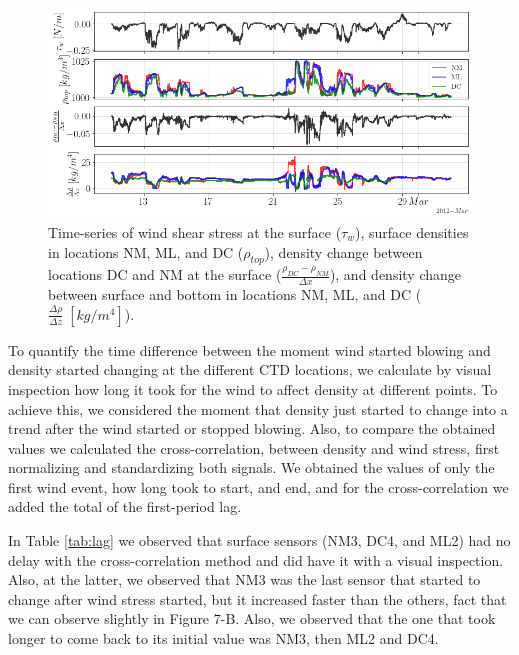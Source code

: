 \documentclass[tesis.tex]{subfiles}
\begin{document}
\begin{figure}[h!]
    \centering
    \includegraphics[width=\textwidth]{Imagenes/diff.png}
    \caption{Time-series of wind shear stress at the surface ($\tau_w$), surface densities in locations NM, ML, and DC ($\rho_{top}$), density change between locations DC and NM at the surface ($\frac{\rho_{DC}-\rho_{NM}}{\Delta x}$), and density change between surface and bottom in locations NM, ML, and DC ($\frac{\Delta \rho}{\Delta z} \; [kg/m^4]$).}
    \label{fig:diff}
\end{figure}

To quantify the time difference between the moment wind started blowing and density started changing at the different CTD locations, we calculate by visual inspection how long it took for the wind to affect density at different points. To achieve this, we considered the moment that density just started to change into a trend after the wind started or stopped blowing. Also, to compare the obtained values we calculated the cross-correlation, between density and wind stress, first normalizing and standardizing both signals. We obtained the values of only the first wind event, how long took to start, and end, and for the cross-correlation we added the total of the first-period lag.

In Table \ref{tab:lag} we observed that surface sensors (NM3, DC4, and ML2) had no delay with the cross-correlation method and did have it with a visual inspection. Also, at the latter, we observed that NM3 was the last sensor that started to change after wind stress started, but it increased faster than the others, fact that we can observe slightly in Figure 7-B. Also, we observed that the one that took longer to come back to its initial value was NM3, then ML2 and DC4.
\end{document}
